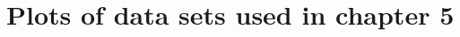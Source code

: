 \\ \vspace{1cm} \\
\\ \vspace{1cm} \\
\\ \vspace{1cm} \\
\\ \vspace{1cm} \\
\\ \vspace{1cm} \\
\\ \vspace{1cm} \\
\\ \vspace{1cm} \\
\\ \vspace{1cm} \\
\\ \vspace{1cm} \\
\\ \vspace{1cm} \\
\\ \vspace{1cm} \\

\chapter{Plots of data sets used in chapter 5}
\label{ch:datasets}

\newcommand{\timeseriesplot}[1]{\begin{center}\texttt{[image: figures/timeseries/\#1\_raw\_data.pdf]}\end{center}}

